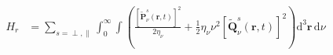 \documentclass{article}
\begin{document}
\begin{equation}
\begin{split}
H_r &= \sum_{s = \perp,\parallel}\int_0^\infty\int\left(\frac{\left[\tilde{\mathbf{P}}_\nu^s(\mathbf{r},t)\right]^2}{2\eta_\nu} + \frac{1}{2}\eta_\nu\nu^2\left[\tilde{\mathbf{Q}}_\nu^s(\mathbf{r},t)\right]^2\right)\mathrm{d}^3\mathbf{r}\,\mathrm{d}\nu\\

\end{split}
\end{equation}
\end{document}
